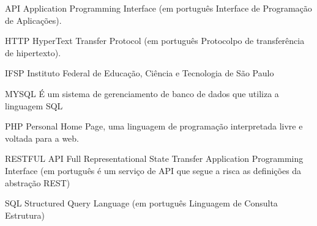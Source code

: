 \begin{siglas}
  \item{API} Application Programming Interface (em português Interface de Programação de Aplicações).
  \item{HTTP} HyperText Transfer Protocol (em português Protocolpo de transferência de hipertexto).
  \item{IFSP} Instituto Federal de Educação, Ciência e Tecnologia de São Paulo
  \item{MYSQL} É um sistema de gerenciamento de banco de dados que utiliza a linguagem SQL
  \item{PHP} Personal Home Page, uma linguagem de programação interpretada livre e voltada para a web.
  \item{RESTFUL API} Full Representational State Transfer Application Programming Interface (em português é um serviço de API que segue a risca as definições da abstração REST)
  \item{SQL} Structured Query Language (em português Linguagem de Consulta Estrutura)
\end{siglas}
